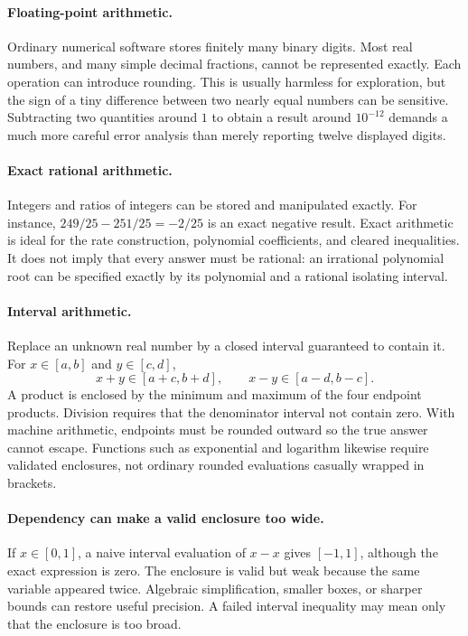 \documentclass[11pt]{article}
\begin{document}
\paragraph{Floating-point arithmetic.}
Ordinary numerical software stores finitely many binary digits. Most real
numbers, and many simple decimal fractions, cannot be represented exactly.
Each operation can introduce rounding. This is usually harmless for
exploration, but the sign of a tiny difference between two nearly equal
numbers can be sensitive. Subtracting two quantities around $1$ to obtain
a result around $10^{-12}$ demands a much more careful error analysis
than merely reporting twelve displayed digits.

\paragraph{Exact rational arithmetic.}
Integers and ratios of integers can be stored and manipulated exactly.
For instance,
$249/25-251/25=-2/25$ is an exact negative result. Exact arithmetic is ideal
for the rate construction, polynomial coefficients, and cleared inequalities.
It does not imply that every answer must be rational: an irrational
polynomial root can be specified exactly by its polynomial and a rational
isolating interval.

\paragraph{Interval arithmetic.}
Replace an unknown real number by a closed interval guaranteed to contain
it. For $x\in[a,b]$ and $y\in[c,d]$,
\[
x+y\in[a+c,b+d],\qquad x-y\in[a-d,b-c].
\]
A product is enclosed by the minimum and maximum of the four endpoint
products. Division requires that the denominator interval not contain zero.
With machine arithmetic, endpoints must be rounded outward so the true
answer cannot escape. Functions such as exponential and logarithm likewise
require validated enclosures, not ordinary rounded evaluations casually
wrapped in brackets.

\paragraph{Dependency can make a valid enclosure too wide.}
If $x\in[0,1]$, a naive interval evaluation of $x-x$ gives $[-1,1]$,
although the exact expression is zero. The enclosure is valid but weak
because the same variable appeared twice. Algebraic simplification,
smaller boxes, or sharper bounds can restore useful precision. A failed
interval inequality may mean only that the enclosure is too broad.
\end{document}
